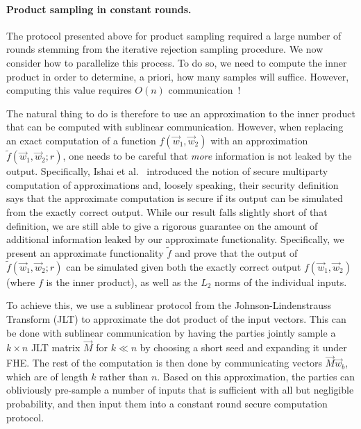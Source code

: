 \paragraph{Product sampling in constant rounds.}
The protocol presented above for product sampling required a
large number of rounds stemming from the iterative rejection sampling
procedure.  We now consider how to parallelize this process.  To do so,
we need to compute the inner product in order to determine, 
a priori, how many samples will
suffice.  However, computing this value requires $O(n)$
communication~\cite{STOC:BabNisSze89}!

The natural thing to do is therefore to use an approximation
to the inner product that can be computed with
sublinear communication.
However, when replacing an exact computation of a function $f(\vec{w}_1, \vec{w}_2)$ with an approximation $\tilde{f}(\vec{w}_1, \vec{w}_2; r)$,
one needs to be careful that \emph{more} information
is not leaked by the output. Specifically,
Ishai et al.~\cite{ICALP:FIMNSW01,ATA:FIMNSW06} introduced the notion of secure multiparty computation of approximations
and, loosely speaking, their security definition says that the approximate computation is secure if its output can be simulated from the exactly correct output. 
While our result falls slightly short of that definition,
we are still able to give a rigorous guarantee on the amount of additional information
leaked by our approximate functionality.
Specifically,
we present an approximate functionality $\tilde{f}$ and prove that the 
output of $\tilde{f}(\vec{w}_1, \vec{w}_2; r)$ can be simulated given both the exactly correct output $f(\vec{w}_1, \vec{w}_2)$ (where $f$ is the inner product), as well as the $L_2$ norms of the individual inputs.

To achieve this, we use a sublinear protocol from the 
Johnson-Lindenstrauss Transform (JLT) to approximate the dot product
of the input vectors.  This can be done with sublinear
communication by having the parties jointly sample a $k \times n$ JLT
matrix $\vec{M}$ for $k \ll n$ by choosing a short seed and expanding it
under FHE.  The rest of the computation is then done by communicating
vectors $\vec{M}\vec{w}_b$, which are of length $k$ rather than $n$.
Based on this approximation, the parties can obliviously pre-sample a
number of inputs that is sufficient with all but negligible probability,
and then input them into a constant round secure computation protocol.

